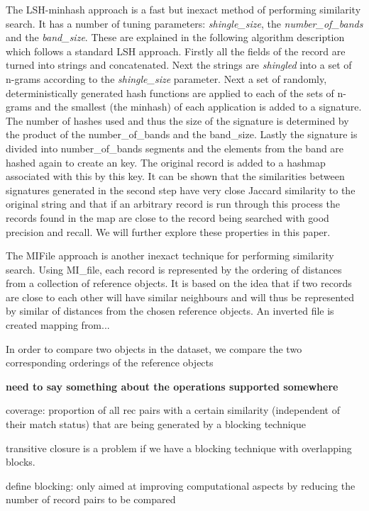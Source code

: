 \documentclass{llncs}
\begin{document}
The LSH-minhash approach is a fast but inexact method of performing similarity search. It has a number of tuning parameters: \textit{shingle\_size}, the \textit{number\_of\_bands} and the \textit{band\_size}. These are explained in the following algorithm description which follows a standard LSH approach. Firstly all the fields of the record are turned into strings and concatenated. Next the strings are \textit{shingled} into a set of n-grams according to the \textit{shingle\_size} parameter. Next a set of randomly, deterministically generated hash functions are applied to each of the sets of n-grams and the smallest (the minhash) of each application is added to a signature. The number of hashes used and thus the size of the signature is determined by the product of the {number\_of\_bands} and the {band\_size}.  Lastly the signature is divided into {number\_of\_bands} segments and the elements from the band are hashed again to create an key. The original record is added to a hashmap associated with this by this key. It can be shown that the similarities between signatures generated in the second step have very close Jaccard similarity to the original string and that if an arbitrary record is run through this process the records found in the map are close to the record being searched with good precision and recall. We will further explore these properties in this paper.

The MIFile \cite{amato2014mi} approach is another inexact technique for performing similarity search. Using  MI_file,  each record is represented by the ordering of distances from a collection of reference objects. It is based on the idea that if two records are close to each other  will have similar neighbours and will thus be represented by similar of distances from the chosen reference objects. An inverted file is created mapping from... 


In order to compare two objects in the dataset, we compare the two corresponding orderings of the reference objects

{\textbf{need to say something about the operations supported somewhere}}

coverage: proportion of all rec pairs with a certain similarity
(independent of their match status) that are being generated by
a blocking  technique

transitive closure is a problem if we have a blocking technique with overlapping blocks.

define blocking: only aimed at improving computational aspects by reducing the number of record pairs to be compared
\end{document}
